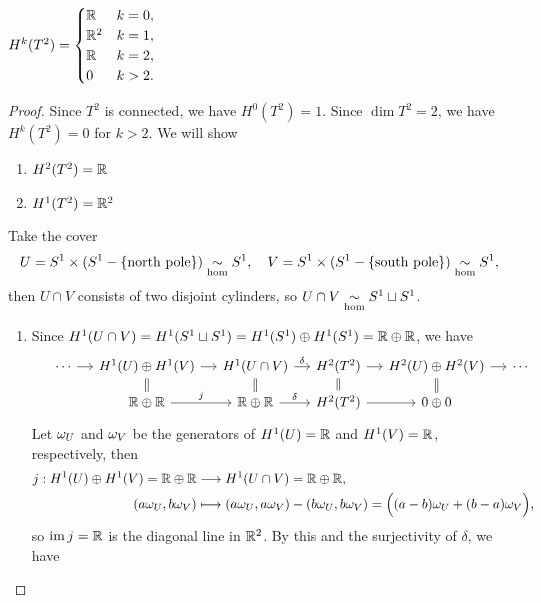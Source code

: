 \begin{example}
    \(H^k(T^2) = \begin{cases}
        \mathbb{R} & k = 0, \\
        \mathbb{R}^2 & k = 1, \\
        \mathbb{R} & k = 2, \\
        0 & k > 2.
    \end{cases}\)
\end{example}
\begin{proof}
    Since \(T^2\) is connected, we have \(H^0(T^2) = 1\). Since \(\dim T^2 = 2\), we have \(H^k(T^2) = 0\) for \(k > 2\). We will show \begin{enumerate}[label=({\itshape \arabic*})]
        \item \(H^2(T^2) = \mathbb{R}\)
        \item \(H^1(T^2) = \mathbb{R}^2\)
    \end{enumerate}
    Take the cover \[
        U = S^1\times (S^1\mathbin{-}\{\text{north pole}\}) \underset{\mathrm{hom}}{\sim} S^1,\quad
        V = S^1\times (S^1\mathbin{-}\{\text{south pole}\}) \underset{\mathrm{hom}}{\sim} S^1,
    \] then \(U\cap V\) consists of two disjoint cylinders, so \(U\cap V\underset{\mathrm{hom}}{\sim} S^1\sqcup S^1\). 
    \begin{enumerate}[label=({\itshape \arabic*})]
        \item Since \(H^1(U\cap V) = H^1(S^1\sqcup S^1) = H^1(S^1)\oplus H^1(S^1) = \mathbb{R}\oplus\mathbb{R}\), we have \[
            \begin{tikzcd}[sep=small]
                & \cdots \ar{r}
                & H^1(U)\oplus H^1(V) \ar{r} \ar[equals]{d}
                & H^1(U\cap V) \ar{r}{\delta} \ar[equals]{d}
                & H^2(T^2) \ar{r} \ar[equals]{d}
                & H^2(U)\oplus H^2(V) \ar{r} \ar[equals]{d}
                & \cdots \\
                & 
                & \R\oplus\R \ar{r}{j}
                & \R\oplus\R \ar{r}{\delta}
                & H^2(T^2) \ar{r}
                & 0\oplus 0
            \end{tikzcd}
        \]
    Let \(\omega_U\) and \(\omega_V\) be the generators of \(H^1(U) = \mathbb{R}\) and \(H^1(V) = \mathbb{R}\), respectively, then \begin{align*}
        j: H^1(U)\oplus H^1(V) = \mathbb{R}\oplus\mathbb{R} &\longrightarrow H^1(U\cap V) = \mathbb{R}\oplus\mathbb{R}, \\
        (a\omega_U, b\omega_V) &\longmapsto (a\omega_U,a\omega_V) - (b\omega_U,b\omega_V) = \Big((a-b)\omega_U + (b-a)\omega_V\Big),
    \end{align*} so \(\operatorname{im} j = \mathbb{R}\) is the diagonal line in \(\mathbb{R}^2\). By this and the surjectivity of \(\delta\), we have \[
\]
\end{enumerate}
\end{proof}
